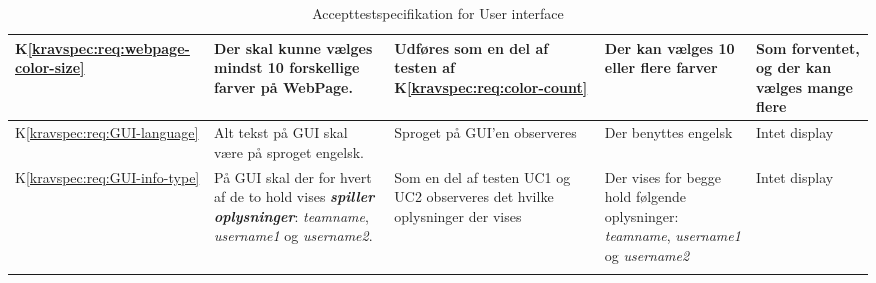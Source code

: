 \documentclass[Accepttestspecifikation/Accepttest_Main.tex]{subfiles}
\begin{document}
\begin{longtable}{|L{0.08\textwidth}|L{0.3\textwidth}|L{0.3\textwidth}|L{0.2\textwidth}|L{0.2\textwidth}|}
K\ref{kravspec:req:webpage-color-size} & Der skal kunne vælges mindst 10 forskellige farver på WebPage. & Udføres som en del af testen af K\ref{kravspec:req:color-count} & Der kan vælges 10 eller flere farver & Som forventet, og der kan vælges mange flere\\ \hline
K\ref{kravspec:req:GUI-language} & Alt tekst på GUI skal være på sproget engelsk. & Sproget på GUI'en observeres & Der benyttes engelsk &  Intet display\\ \hline
K\ref{kravspec:req:GUI-info-type} & På GUI skal der for hvert af de to hold vises \textit{\textbf{spiller oplysninger}}: \textit{teamname}, \textit{username1} og \textit{username2}. & Som en del af testen UC1 og UC2 observeres det hvilke oplysninger der vises & Der vises for begge hold følgende oplysninger: \textit{teamname}, \textit{username1} og \textit{username2}& Intet display \\ \hline


\caption{Accepttestspecifikation for User interface}
\label{tab:IkkeFunktFysiske}
\end{longtable}
\end{document}
